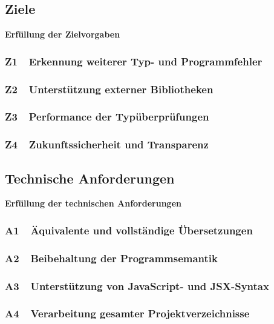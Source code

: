     \subsection{Ziele}
      \begin{frame}
        \LARGE\textbf{Erfüllung der Zielvorgaben}
      \end{frame}

      \begin{frame}
        \frametitle{Z1~~Erkennung weiterer Typ- und Programmfehler}
      \end{frame}

      \begin{frame}
        \frametitle{Z2~~Unterstützung externer Bibliotheken}
      \end{frame}

      \begin{frame}
        \frametitle{Z3~~Performance der Typüberprüfungen}
      \end{frame}

      \begin{frame}
        \frametitle{Z4~~Zukunftssicherheit und Transparenz}
      \end{frame}

    \subsection{Technische Anforderungen}
      \begin{frame}
        \LARGE\textbf{Erfüllung der technischen Anforderungen}
      \end{frame}

      \begin{frame}
        \frametitle{A1~~Äquivalente und vollständige Übersetzungen}
      \end{frame}

      \begin{frame}
        \frametitle{A2~~Beibehaltung der Programmsemantik}
      \end{frame}

      \begin{frame}
        \frametitle{A3~~Unterstützung von JavaScript- und JSX-Syntax}
      \end{frame}

      \begin{frame}
        \frametitle{A4~~Verarbeitung gesamter Projektverzeichnisse}
      \end{frame}

